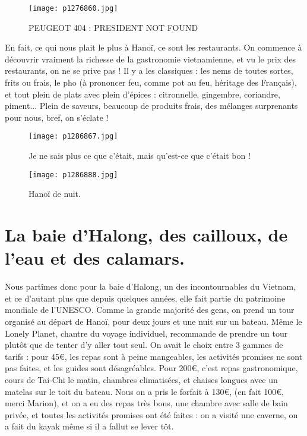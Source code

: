 \documentclass{book}
\begin{document}
\begin{figure}[h]
\centering
\texttt{[image: p1276860.jpg]}
\caption*{PEUGEOT 404 : PRESIDENT NOT FOUND}
\end{figure}

En fait, ce qui nous plait le plus à Hanoï, ce sont les restaurants. On commence à découvrir vraiment la richesse de la gastronomie vietnamienne, et vu le prix des restaurants, on ne se prive pas ! Il y a les classiques : les nems de toutes sortes, frits ou frais, le pho (à prononcer feu, comme pot au feu, héritage des Français), et tout plein de plats avec plein d'épices : citronnelle, gingembre, coriandre, piment... Plein de saveurs, beaucoup de produits frais, des mélanges surprenants pour nous, bref, on s'éclate !


\begin{figure}[h]
\centering
\texttt{[image: p1286867.jpg]}
\caption*{Je ne sais plus ce que c'était, mais qu'est-ce que c'était bon !}
\end{figure}


\begin{figure}[h]
\centering
\texttt{[image: p1286888.jpg]}
\caption*{Hanoï de nuit.}
\end{figure}



\chapter{La baie d'Halong, des cailloux, de l'eau et des calamars.}
Nous partîmes donc pour la baie d'Halong, un des incontournables du Vietnam, et ce d'autant plus que depuis quelques années, elle fait partie du patrimoine mondiale de l'UNESCO. Comme la grande majorité des gens, on prend un tour organisé au départ de Hanoï, pour deux jours et une nuit sur un bateau. Même le Lonely Planet, chantre du voyage individuel, recommande de prendre un tour plutôt que de tenter d'y aller tout seul. On avait le choix entre 3 gammes de tarifs : pour 45\euro, les repas sont à peine mangeables, les activités promises ne sont pas faites, et les guides sont désagréables. Pour 200\euro, c'est repas gastronomique, cours de Tai-Chi le matin, chambres climatisées, et chaises longues avec un matelas sur le toit du bateau. Nous on a pris le forfait à 130\euro, (en fait 100\euro, merci Marion), et on a eu des repas très bons, une chambre avec salle de bain privée, et toutes les activités promises ont été faites : on a visité une caverne, on a fait du kayak même si il a fallut se lever tôt.
\end{document}
